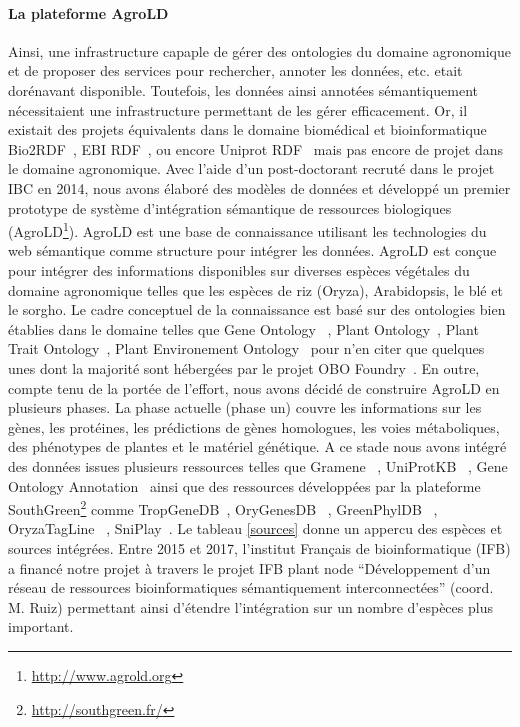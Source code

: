 \paragraph*{La plateforme AgroLD} Ainsi, une infrastructure capaple de gérer des ontologies du domaine agronomique et de proposer des services pour rechercher, annoter les données, etc. etait dorénavant disponible. Toutefois, les données ainsi annotées sémantiquement nécessitaient une infrastructure permettant de les gérer efficacement. Or, il existait des projets équivalents dans le domaine biomédical et bioinformatique Bio2RDF~\cite{Belleau2008a,Callahan2013}, EBI RDF~\cite{Jupp2014}, ou encore Uniprot RDF~\cite{redaschi2009}  mais pas encore de projet dans le domaine agronomique. Avec l’aide d’un post-doctorant recruté dans le projet IBC en 2014, nous avons élaboré des modèles de données et développé un premier prototype de système d’intégration sémantique de ressources biologiques (AgroLD\footnote{\url{http://www.agrold.org}}). AgroLD est une base de connaissance utilisant les technologies du web sémantique comme structure pour intégrer les données. AgroLD est conçue pour intégrer des informations disponibles sur diverses espèces végétales du domaine agronomique telles que les espèces de riz (Oryza), Arabidopsis, le blé et le sorgho. Le cadre conceptuel de la connaissance est basé sur des ontologies bien établies dans le domaine telles que Gene Ontology ~\cite{Ashburner2000,TheGeneOntologyConsortium2014}, Plant Ontology~\cite{plantOntology2002}, Plant Trait Ontology~\cite{planteome2018}, Plant Environement Ontology~\cite{envo2016} pour n'en citer que quelques unes dont la majorité sont hébergées par le projet OBO Foundry~\cite{Smith2007}. En outre, compte tenu de la portée de l'effort, nous avons décidé de construire AgroLD en plusieurs phases. La phase actuelle (phase un) couvre les informations sur les gènes, les protéines, les prédictions de gènes homologues, les voies métaboliques, des phénotypes de plantes et le matériel génétique. A ce stade nous avons intégré des données issues plusieurs ressources telles que Gramene~\cite{gramene2018} , UniProtKB~\cite{uniprot2011} , Gene Ontology Annotation~\cite{goa2009}  ainsi que des ressources développées par la plateforme SouthGreen\footnote{\url{http://southgreen.fr/}} comme TropGeneDB~\cite{tropgenedb2012}, OryGenesDB~\cite{Droc2009b} , GreenPhylDB~\cite{greenphyl2011} , OryzaTagLine~\cite{larmande2008} , SniPlay~\cite{sniplay3}.  Le tableau \ref{sources} donne un appercu des espèces et sources intégrées. Entre 2015 et 2017, l’institut Français de bioinformatique (IFB) a financé notre projet à travers le projet IFB plant node   “Développement d’un réseau de ressources bioinformatiques sémantiquement interconnectées” (coord. M. Ruiz) permettant ainsi d'étendre l'intégration sur un nombre d'espèces plus important.


